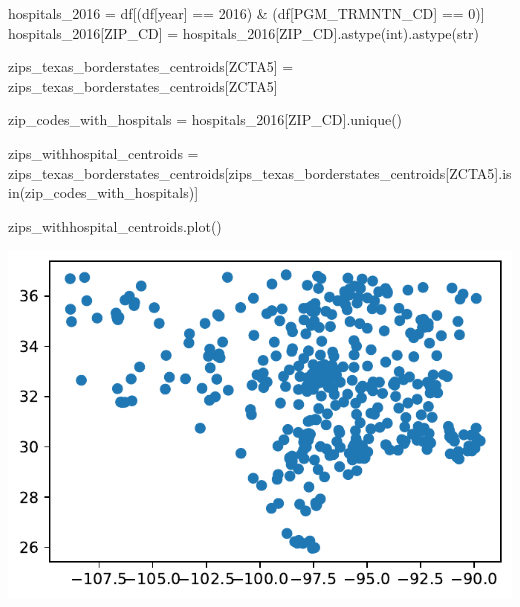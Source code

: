 \documentclass[
  letterpaper,
  DIV=11,
  numbers=noendperiod]{scrartcl}
\newenvironment{Shaded}{\begin{snugshade}}{\end{snugshade}}
\newcommand{\BuiltInTok}[1]{\textcolor[rgb]{0.00,0.23,0.31}{#1}}
\newcommand{\DecValTok}[1]{\textcolor[rgb]{0.68,0.00,0.00}{#1}}
\newcommand{\NormalTok}[1]{\textcolor[rgb]{0.00,0.23,0.31}{#1}}
\newcommand{\OperatorTok}[1]{\textcolor[rgb]{0.37,0.37,0.37}{#1}}
\newcommand{\StringTok}[1]{\textcolor[rgb]{0.13,0.47,0.30}{#1}}
\begin{document}
\begin{Shaded}
\begin{Highlighting}[]
\NormalTok{hospitals\_2016 }\OperatorTok{=}\NormalTok{ df[(df[}\StringTok{\textquotesingle{}year\textquotesingle{}}\NormalTok{] }\OperatorTok{==} \DecValTok{2016}\NormalTok{) }\OperatorTok{\&}\NormalTok{ (df[}\StringTok{\textquotesingle{}PGM\_TRMNTN\_CD\textquotesingle{}}\NormalTok{] }\OperatorTok{==} \DecValTok{0}\NormalTok{)]}
\NormalTok{hospitals\_2016[}\StringTok{\textquotesingle{}ZIP\_CD\textquotesingle{}}\NormalTok{] }\OperatorTok{=}\NormalTok{ hospitals\_2016[}\StringTok{\textquotesingle{}ZIP\_CD\textquotesingle{}}\NormalTok{].astype(}\BuiltInTok{int}\NormalTok{).astype(}\BuiltInTok{str}\NormalTok{)}

\NormalTok{zips\_texas\_borderstates\_centroids[}\StringTok{\textquotesingle{}ZCTA5\textquotesingle{}}\NormalTok{] }\OperatorTok{=}\NormalTok{ zips\_texas\_borderstates\_centroids[}\StringTok{\textquotesingle{}ZCTA5\textquotesingle{}}\NormalTok{]}

\NormalTok{zip\_codes\_with\_hospitals }\OperatorTok{=}\NormalTok{ hospitals\_2016[}\StringTok{\textquotesingle{}ZIP\_CD\textquotesingle{}}\NormalTok{].unique()}

\NormalTok{zips\_withhospital\_centroids }\OperatorTok{=}\NormalTok{ zips\_texas\_borderstates\_centroids[zips\_texas\_borderstates\_centroids[}\StringTok{\textquotesingle{}ZCTA5\textquotesingle{}}\NormalTok{].isin(zip\_codes\_with\_hospitals)]}

\NormalTok{zips\_withhospital\_centroids.plot()}
\end{Highlighting}
\end{Shaded}

\includegraphics{ps4_files/figure-pdf/cell-20-output-1.pdf}
\end{document}
